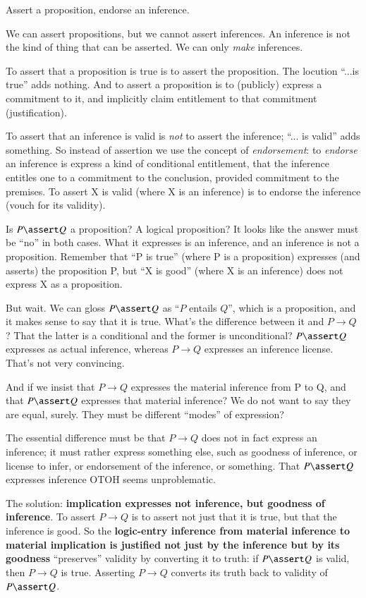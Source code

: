 \documentclass{article}
\begin{document}
Assert a proposition, endorse an inference.

We can assert propositions, but we cannot assert inferences. An
inference is not the kind of thing that can be asserted. We can only
\textit{make} inferences.

To assert that a proposition is true is to assert the proposition. The
locution ``...is true'' adds nothing. And to assert a proposition is
to (publicly) express a commitment to it, and implicitly claim
entitlement to that commitment (justification).

To assert that an inference is valid is \textit{not} to assert the
inference; ``... is valid'' adds something. So instead of assertion we
use the concept of \textit{endorsement}: to \textit{endorse} an
inference is express a kind of conditional entitlement, that the
inference entitles one to a commitment to the conclusion, provided
commitment to the premises. To assert X is valid (where X is an
inference) is to endorse the inference (vouch for its validity).

Is \(P\linfer Q\) a proposition? A logical proposition? It looks like
the answer must be ``no'' in both cases. What it expresses is an
inference, and an inference is not a proposition. Remember that ``P is
true'' (where P is a proposition) expresses (and asserts) the
proposition P, but ``X is good'' (where X is an inference) does not
express X as a proposition.

But wait. We can gloss \(P\linfer Q\) as ``\(P\) entails \(Q\)'', which
is a proposition, and it makes sense to say that it is true. What's
the difference between it and \(P\rightarrow Q\)? That the latter is a
conditional and the former is unconditional? \(P\linfer Q\) expresses
as actual inference, whereas \(P\rightarrow Q\) expresses an inference
license. That's not very convincing.

And if we insist that \(P\rightarrow Q\) expresses the material
inference from P to Q, and that \(P\linfer Q\) expresses that material
inference? We do not want to say they are equal, surely. They must be
different ``modes'' of expression?

The essential difference must be that \(P\rightarrow Q\) does not in
fact express an inference; it must rather express something else, such
as goodness of inference, or license to infer, or endorsement of the
inference, or something. That \(P\linfer Q\) expresses inference OTOH
seems unproblematic.

The solution: \textbf{implication expresses not inference, but
  goodness of inference}. To assert \(P\rightarrow Q\) is to assert
not just that it is true, but that the inference \PinfQ is good.
So the \textbf{logic-entry inference from material inference to
  material implication is justified not just by the inference but by
  its goodness} ``preserves'' validity by converting it to truth: if
\(P\linfer Q\) is valid, then \(P\rightarrow Q\) is true. Asserting
\(P\rightarrow Q\) converts its truth back to validity of \(P\linfer
Q\).
\end{document}
